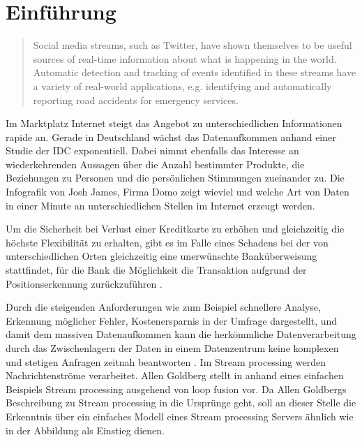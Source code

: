 \chapter{Einführung}

\begin{quote}
Social media streams, such as Twitter, have shown themselves to be useful sources of real-time information about what is happening in the world. Automatic detection and tracking of events identified in these streams have a variety of real-world applications, e.g. identifying and automatically reporting road accidents for emergency services.
\end{quote}

Im Marktplatz Internet steigt das Angebot zu unterschiedlichen Informationen rapide an. Gerade in Deutschland wächst das Datenaufkommen anhand einer Studie der IDC  exponentiell. Dabei nimmt ebenfalls das Interesse an wiederkehrenden Aussagen über die Anzahl bestimmter Produkte, die Beziehungen zu Personen und die persönlichen Stimmungen zueinander zu. Die Infografik  von Josh James, Firma Domo zeigt wieviel und welche Art von Daten in einer Minute an unterschiedlichen Stellen im Internet erzeugt werden. 

Um die Sicherheit bei Verlust einer Kreditkarte zu erhöhen und gleichzeitig die höchste Flexibilität zu erhalten, gibt es im Falle eines Schadens bei der von unterschiedlichen Orten gleichzeitig eine unerwünschte Banküberweisung stattfindet, für die Bank die Möglichkeit die Transaktion aufgrund der Positionserkennung zurückzuführen .

Durch die steigenden Anforderungen wie zum Beispiel schnellere Analyse, Erkennung möglicher Fehler, Kostenersparnis in der Umfrage  dargestellt, und damit dem massiven Datenaufkommen kann die herkömmliche Datenverarbeitung  durch das Zwischenlagern der Daten in einem Datenzentrum keine komplexen und stetigen Anfragen zeitnah beantworten . Im Stream processing werden Nachrichtenströme verarbeitet. Allen Goldberg stellt in  anhand eines einfachen Beispiels Stream processing ausgehend von loop fusion  vor. Da Allen Goldbergs Beschreibung zu Stream processing in die Ursprünge geht, soll an dieser Stelle die Erkenntnis über ein einfaches Modell eines Stream processing Servers ähnlich wie in der Abbildung  als Einstieg dienen. 

